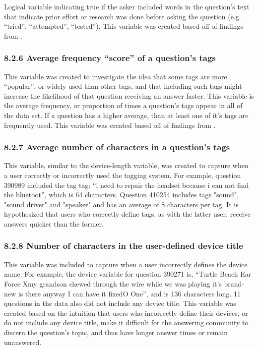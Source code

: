 \documentclass{article}
\begin{document}
Logical variable indicating true if the asker included words in the question's text that indicate prior effort or research was done before asking the question (e.g. ``tried'', ``attempted'', ``tested''). This variable was created based off of findings from \cite{Bhat2014}. 


\subsubsection*{8.2.6 Average frequency ``score'' of a question's tags}

This variable was created to investigate the idea that some tags are more ``popular'', or widely used than other tags, and that including such tags might increase the likelihood of that question receiving an answer faster. This variable is the average frequency, or proportion of times a question's tags appear in all of the data set. If a question has a higher average, than at least one of it's tags are frequently used. This variable was created based off of findings from \cite{Bhat2014}. 


\subsubsection*{8.2.7 Average number of characters in a question's tags}

This variable, similar to the device-length variable, was created to capture when a user correctly or incorrectly used the tagging system. For example, question 390989 included the tag tag: “i need to repair the headset because i can not find the bluetoot”, which is 64 characters. Question 410254 includes tags "sound", "sound driver" and "speaker" and has an average of 8 characters per tag. It is hypothesized that users who correctly define tags, as with the latter user, receive answers quicker than the former. 


\subsubsection*{8.2.8 Number of characters in the user-defined device title}

This variable was included to capture when a user incorrectly defines the device name. For example, the device variable for question 390271 is, “Turtle Beach Ear Force Xmy grandson chewed through the wire while we was playing it's brand-new is there anyway I can have it fixedO One”, and is 136 characters long. 11 questions in the data also did not include any device title. This variable was created based on the intuition that users who incorrectly define their devices, or do not include any device title, make it difficult for the answering community to discern the question's topic, and thus have longer answer times or remain unanswered.
\end{document}
